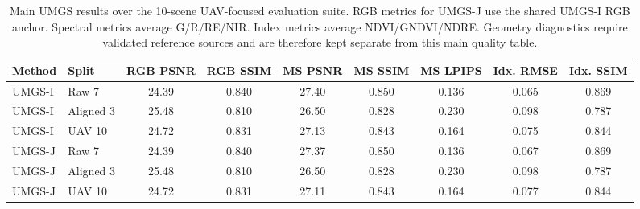 ﻿\begin{table}[!t]
    \caption{Main UMGS results over the 10-scene UAV-focused evaluation suite. RGB metrics for UMGS-J use the shared UMGS-I RGB anchor. Spectral metrics average G/R/RE/NIR. Index metrics average NDVI/GNDVI/NDRE. Geometry diagnostics require validated reference sources and are therefore kept separate from this main quality table.}
    \label{tab:main-uav10}
    \centering
    \scriptsize
    \setlength{\tabcolsep}{3pt}
    \begin{tabular}{llccccccc}
        \toprule
        Method & Split & RGB PSNR & RGB SSIM & MS PSNR & MS SSIM & MS LPIPS & Idx. RMSE & Idx. SSIM \\
        \midrule
        UMGS-I & Raw 7 & 24.39 & 0.840 & 27.40 & 0.850 & 0.136 & 0.065 & 0.869 \\
        UMGS-I & Aligned 3 & 25.48 & 0.810 & 26.50 & 0.828 & 0.230 & 0.098 & 0.787 \\
        UMGS-I & UAV 10 & 24.72 & 0.831 & 27.13 & 0.843 & 0.164 & 0.075 & 0.844 \\
        \midrule
        UMGS-J & Raw 7 & 24.39 & 0.840 & 27.37 & 0.850 & 0.136 & 0.067 & 0.869 \\
        UMGS-J & Aligned 3 & 25.48 & 0.810 & 26.50 & 0.828 & 0.230 & 0.098 & 0.787 \\
        UMGS-J & UAV 10 & 24.72 & 0.831 & 27.11 & 0.843 & 0.164 & 0.077 & 0.844 \\
        \bottomrule
    \end{tabular}
\end{table}

